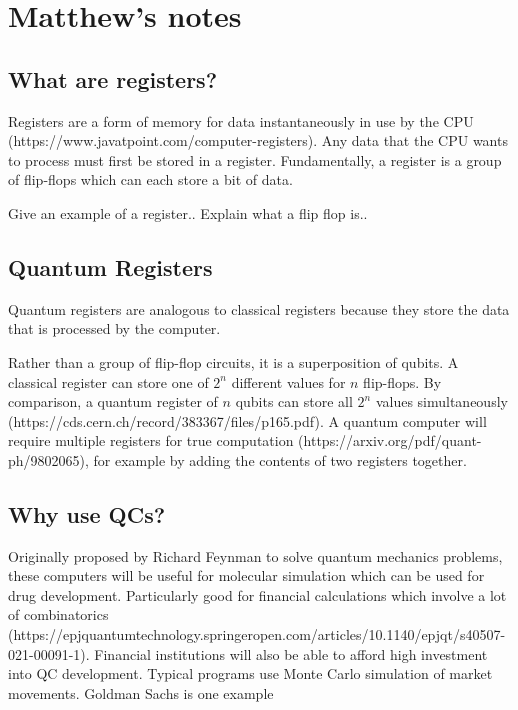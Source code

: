 \section{Matthew's notes}

\subsection{What are registers?}
Registers are a form of memory for data instantaneously in use by the CPU (https://www.javatpoint.com/computer-registers). Any data that the CPU wants to process must first be stored in a register. Fundamentally, a register is a group of flip-flops which can each store a bit of data. 

Give an example of a register..
Explain what a flip flop is..

\subsection{Quantum Registers}
Quantum registers are analogous to classical registers because they store the data that is processed by the computer. 

Rather than a group of flip-flop circuits, it is a superposition of qubits. A classical register can store one of $2^n$ different values for $n$ flip-flops. By comparison, a quantum register of $n$ qubits can store all $2^n$ values simultaneously (https://cds.cern.ch/record/383367/files/p165.pdf). A quantum computer will require multiple registers for true computation (https://arxiv.org/pdf/quant-ph/9802065), for example by adding the contents of two registers together.

\subsection{Why use QCs?}
Originally proposed by Richard Feynman to solve quantum mechanics problems, these computers will be useful for molecular simulation which can be used for drug development. Particularly good for financial calculations which involve a lot of combinatorics (https://epjquantumtechnology.springeropen.com/articles/10.1140/epjqt/s40507-021-00091-1). Financial institutions will also be able to afford high investment into QC development. Typical programs use Monte Carlo simulation of market movements. Goldman Sachs is one example

